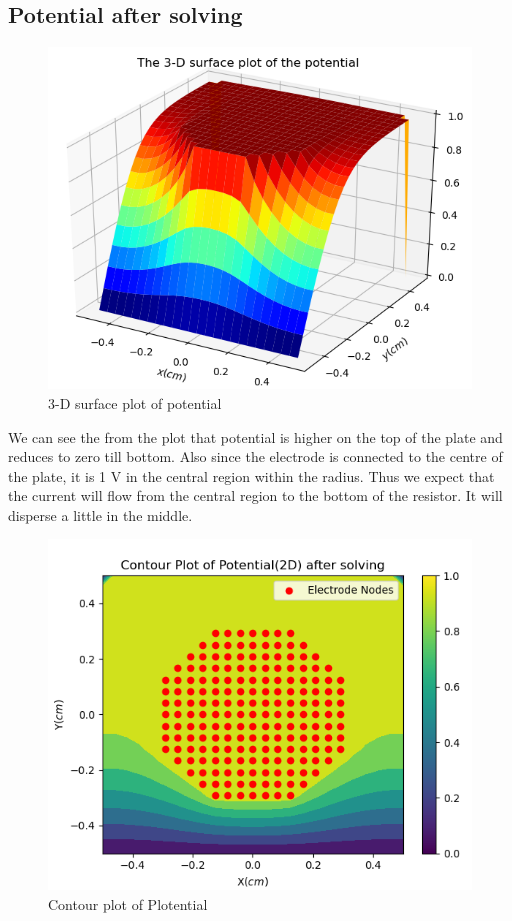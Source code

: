 \documentclass[11pt, a4paper]{article}
\begin{document}
    \subsection{Potential after solving}
    \begin{figure}[!h]
        \centering
        \includegraphics[scale = 0.8]{Figure4.png}
        \caption{3-D surface plot of potential}
        \label{fig:Figure 4}
    \end{figure}
    We can see the from the plot that potential is higher on the top of the plate and reduces to zero till bottom. Also since the electrode is connected to the centre of the plate, it is 1 V in the central region within the radius. Thus we expect that the current will flow from the central region to the bottom of the resistor. It will disperse a little in the middle.
    \begin{figure}[!h]
        \centering
        \includegraphics[scale = 0.8]{Figure5.png}
        \caption{Contour plot of Plotential}
        \label{fig:Figure 5}
    \end{figure}
\end{document}

